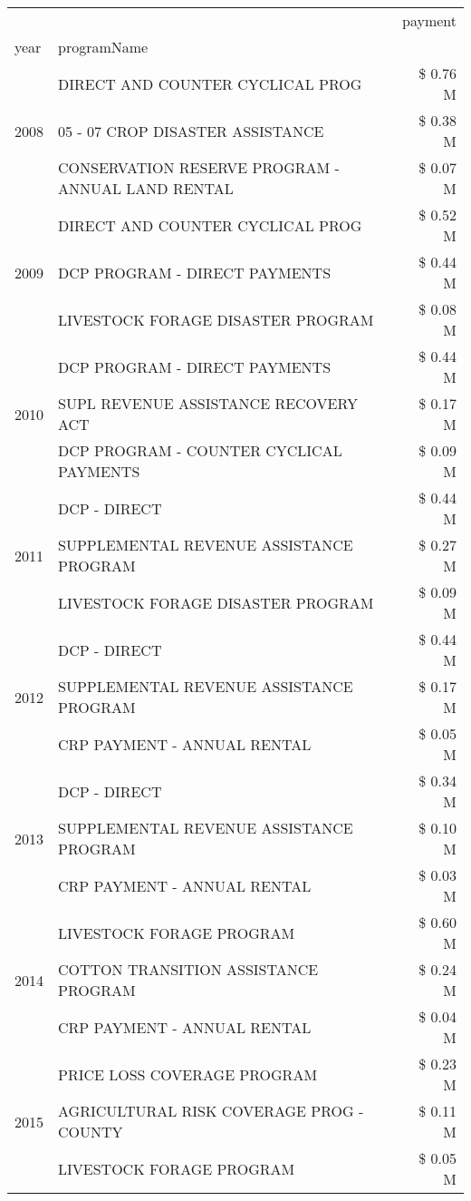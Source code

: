 \begin{tabular}{llr}
\toprule
 &  & payment \\
year & programName &  \\
\midrule
\multirow[t]{3}{*}{2008} & DIRECT AND COUNTER CYCLICAL PROG & \$ 0.76 M \\
 & 05 - 07 CROP DISASTER ASSISTANCE & \$ 0.38 M \\
 & CONSERVATION RESERVE PROGRAM - ANNUAL LAND RENTAL & \$ 0.07 M \\
\cline{1-3}
\multirow[t]{3}{*}{2009} & DIRECT AND COUNTER CYCLICAL PROG & \$ 0.52 M \\
 & DCP PROGRAM - DIRECT PAYMENTS & \$ 0.44 M \\
 & LIVESTOCK FORAGE DISASTER  PROGRAM & \$ 0.08 M \\
\cline{1-3}
\multirow[t]{3}{*}{2010} & DCP PROGRAM - DIRECT PAYMENTS & \$ 0.44 M \\
 & SUPL REVENUE ASSISTANCE RECOVERY ACT & \$ 0.17 M \\
 & DCP PROGRAM - COUNTER CYCLICAL PAYMENTS & \$ 0.09 M \\
\cline{1-3}
\multirow[t]{3}{*}{2011} & DCP - DIRECT & \$ 0.44 M \\
 & SUPPLEMENTAL REVENUE ASSISTANCE PROGRAM & \$ 0.27 M \\
 & LIVESTOCK FORAGE DISASTER PROGRAM & \$ 0.09 M \\
\cline{1-3}
\multirow[t]{3}{*}{2012} & DCP - DIRECT & \$ 0.44 M \\
 & SUPPLEMENTAL REVENUE ASSISTANCE PROGRAM & \$ 0.17 M \\
 & CRP PAYMENT - ANNUAL RENTAL & \$ 0.05 M \\
\cline{1-3}
\multirow[t]{3}{*}{2013} & DCP - DIRECT & \$ 0.34 M \\
 & SUPPLEMENTAL REVENUE ASSISTANCE PROGRAM & \$ 0.10 M \\
 & CRP PAYMENT - ANNUAL RENTAL & \$ 0.03 M \\
\cline{1-3}
\multirow[t]{3}{*}{2014} & LIVESTOCK FORAGE PROGRAM & \$ 0.60 M \\
 & COTTON TRANSITION ASSISTANCE PROGRAM & \$ 0.24 M \\
 & CRP PAYMENT - ANNUAL RENTAL & \$ 0.04 M \\
\cline{1-3}
\multirow[t]{3}{*}{2015} & PRICE LOSS COVERAGE PROGRAM & \$ 0.23 M \\
 & AGRICULTURAL RISK COVERAGE PROG - COUNTY & \$ 0.11 M \\
 & LIVESTOCK FORAGE PROGRAM & \$ 0.05 M \\

\end{tabular}
